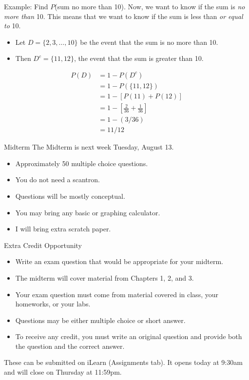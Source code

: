 \begin{frame}{Example: Find $P$(sum no more than 10).}
    Now, we want to know if the sum is \textit{no more than} 10. This means that we want to know if the sum is less than \textit{or equal to} 10.
    \begin{itemize}
        \item Let $D=\{2,3,\dots,10\}$ be the event that the sum is no more than 10.
        \item Then $D^c=\{11,12\}$, the event that the sum is greater than 10.
    \end{itemize}
    \begin{align*}
            P(D) &=1-P(D^c) \\
            & =1-P(\{11,12\}) \\
            & =1-[P(11)+P(12)] \\
            & =1-\left[\frac{2}{36}+\frac{1}{36}\right] \\
            & =1-(3/36) \\
            & =11/12
        \end{align*}
\end{frame}

\begin{frame}{Midterm}
    The Midterm is next week Tuesday, August 13.
    \begin{itemize}
        \item Approximately 50 multiple choice questions.
        \item You do not need a scantron.
        \item Questions will be mostly conceptual.
        \item You may bring any basic or graphing calculator.
        \item I will bring extra scratch paper.
    \end{itemize}
\end{frame}

\begin{frame}{Extra Credit Opportunity}
    \begin{itemize}
        \item Write an exam question that would be appropriate for your midterm. 
        \item The midterm will cover material from Chapters 1, 2, and 3. 
        \item Your exam question must come from material covered in class, your homeworks, or your labs. 
        \item Questions may be either multiple choice or short answer. 
        \item To receive any credit, you must write an original question and provide both the question and the correct answer.
    \end{itemize}
    These can be submitted on iLearn (Assignments tab). It opens today at 9:30am and will close on Thursday at 11:59pm.
\end{frame}

